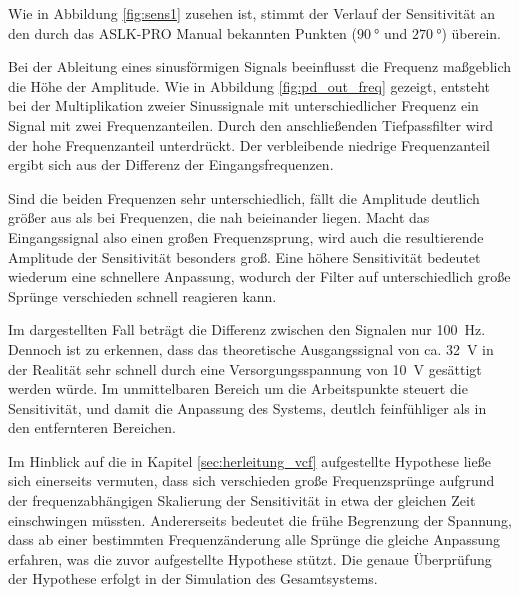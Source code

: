 \documentclass[../main.tex]{subfiles}
\begin{document}


Wie in Abbildung \ref{fig:sens1} zusehen ist, stimmt der Verlauf der Sensitivität an den durch das ASLK-PRO Manual bekannten Punkten ($\SI{90}{\degree}$ und $\SI{270}{\degree}$) überein. \par
\medskip

Bei der Ableitung eines sinusförmigen Signals beeinflusst die Frequenz maßgeblich die Höhe der Amplitude. Wie in Abbildung \ref{fig:pd_out_freq} gezeigt, entsteht bei der Multiplikation zweier Sinussignale mit unterschiedlicher Frequenz ein Signal mit zwei Frequenzanteilen. Durch den anschließenden Tiefpassfilter wird der hohe Frequenzanteil unterdrückt. Der verbleibende niedrige Frequenzanteil ergibt sich aus der Differenz der Eingangsfrequenzen.\par
\medskip

Sind die beiden Frequenzen sehr unterschiedlich, fällt die Amplitude deutlich größer aus als bei Frequenzen, die nah beieinander liegen. Macht das Eingangssignal also einen großen Frequenzsprung, wird auch die resultierende Amplitude der Sensitivität besonders groß. Eine höhere Sensitivität bedeutet wiederum eine schnellere Anpassung, wodurch der Filter auf unterschiedlich große Sprünge verschieden schnell reagieren kann.\par
\medskip

Im dargestellten Fall beträgt die Differenz zwischen den Signalen nur \SI{100}{\hertz}. Dennoch ist zu erkennen, dass das theoretische Ausgangssignal von ca. \SI{32}{\volt} in der Realität sehr schnell durch eine Versorgungsspannung von \SI{10}{\volt} gesättigt werden würde. Im unmittelbaren Bereich um die Arbeitspunkte steuert die Sensitivität, und damit die Anpassung des Systems, deutlch feinfühliger als in den entfernteren Bereichen.\par
\medskip

Im Hinblick auf die in Kapitel \ref{sec:herleitung_vcf} aufgestellte Hypothese ließe sich einerseits vermuten, dass sich verschieden große Frequenzsprünge aufgrund der frequenzabhängigen Skalierung der Sensitivität in etwa der gleichen Zeit einschwingen müssten. Andererseits bedeutet die frühe Begrenzung der Spannung, dass ab einer bestimmten Frequenzänderung alle Sprünge die gleiche Anpassung erfahren, was die zuvor aufgestellte Hypothese stützt. Die genaue Überprüfung der Hypothese erfolgt in der Simulation des Gesamtsystems. \par
\medskip 
\end{document}
